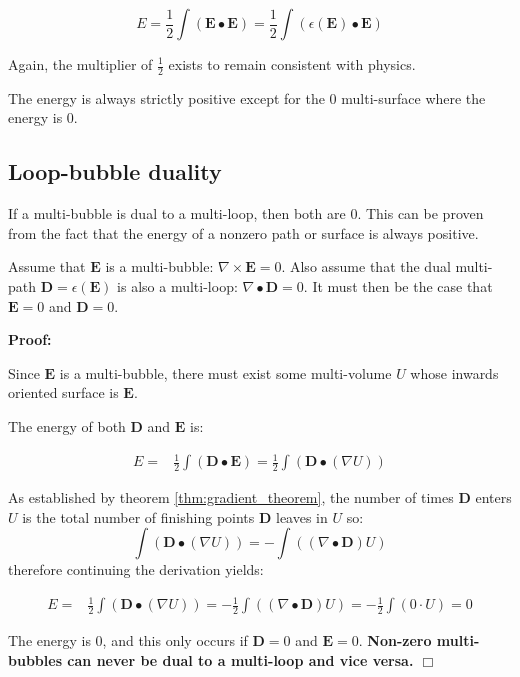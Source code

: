 \[E = \frac{1}{2}\int (\mathbf{E} \bullet \mathbf{E}) = \frac{1}{2}\int (\epsilon(\mathbf{E}) \bullet \mathbf{E})\]

Again, the multiplier of \(\frac{1}{2}\) exists to remain consistent with physics.

The energy is always strictly positive except for the \(0\) multi-surface where the energy is \(0\).


\subsection{Loop-bubble duality}


If a multi-bubble is dual to a multi-loop, then both are \(0\). This can be proven from  the fact that the energy of a nonzero path or surface is always positive. 

\begin{thm}\label{thm:loop_bubble_duality}
Assume that \(\mathbf{E}\) is a multi-bubble: \(\nabla \times \mathbf{E} = 0\). Also assume that the dual multi-path \(\mathbf{D} = \epsilon(\mathbf{E})\) is also a multi-loop: \(\nabla \bullet \mathbf{D} = 0\). It must then be the case that \(\mathbf{E} = 0\) and \(\mathbf{D} = 0\).
\end{thm}
\textbf{Proof:}

Since \(\mathbf{E}\) is a multi-bubble, there must exist some multi-volume \(U\) whose inwards oriented surface is \(\mathbf{E}\). 

The energy of both \(\mathbf{D}\) and \(\mathbf{E}\) is:

\begin{align*}
E = & \frac{1}{2}\int (\mathbf{D} \bullet \mathbf{E}) 
= \frac{1}{2} \int (\mathbf{D} \bullet (\nabla U)) 
\end{align*} 

As established by theorem \ref{thm:gradient_theorem}, the number of times \(\mathbf{D}\) enters \(U\) is the total number of finishing points \(\mathbf{D}\) leaves in \(U\) so: 
\[\int (\mathbf{D} \bullet (\nabla U)) = -\int ((\nabla \bullet \mathbf{D}) U)\] 
therefore continuing the derivation yields:

\begin{align*}
E = & \frac{1}{2} \int (\mathbf{D} \bullet (\nabla U)) 
= -\frac{1}{2} \int ((\nabla \bullet \mathbf{D}) U) 
= -\frac{1}{2} \int (0 \cdot U) 
= 0
\end{align*}

The energy is \(0\), and this only occurs if \(\mathbf{D} = 0\) and \(\mathbf{E} = 0\). {\bf Non-zero multi-bubbles can never be dual to a multi-loop and vice versa. \(\Box\)}


